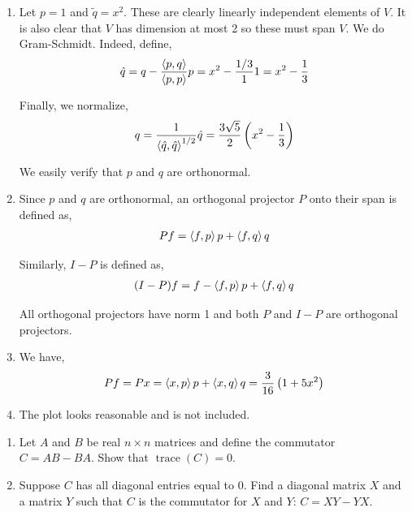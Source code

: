 \documentclass[10pt]{article}
\begin{document}
\begin{solution}[Solution]
\begin{enumerate}[label=(\alph*)]
    \item Let \( p = 1 \) and \( \tilde{q} = x^2 \). These are clearly linearly independent elements of \( V \). It is also clear that \( V \) has dimension at most 2 so these must span \( V \). We do Gram-Schmidt. Indeed, define,
        \begin{align*}
            \hat{q} = q - \frac{\left\langle p,q \right\rangle}{\left\langle p,p \right\rangle}p = x^2 - \frac{1/3}{1} 1 = x^2 - \frac{1}{3}
        \end{align*}
        
        Finally, we normalize,
        \begin{align*}
            q = \frac{1}{\left\langle \hat{q},\hat{q} \right\rangle^{1/2}} \hat{q} = \frac{3\sqrt{5}}{2} \left( x^2 - \frac{1}{3} \right)
        \end{align*}
        
        We easily verify that \( p \) and \( q \) are orthonormal.

    \item Since \( p \) and \( q \) are orthonormal, an orthogonal projector \( P \) onto their span is defined as,
        \begin{align*}
            Pf = \left\langle f,p \right\rangle p + \left\langle f,q \right\rangle q
        \end{align*}
        
        Similarly, \( I-P \) is defined as,
        \begin{align*}
            (I-P)f = f - \left\langle f,p \right\rangle p + \left\langle f,q \right\rangle q
        \end{align*}
        
        All orthogonal projectors have norm 1 and both \( P \) and \( I-P \) are orthogonal projectors.

    \item
        We have,
        \begin{align*}
            Pf = Px = \left\langle x,p \right\rangle p + \left\langle x,q \right\rangle q = \frac{3}{16} \left( 1+5x^2 \right)
        \end{align*}
        
    \item The plot looks reasonable and is not included.

\end{enumerate}
\end{solution}



\begin{problem}
    \begin{enumerate}[label=(\alph*),nolistsep]
        \item Let \( A \) and \( B \) be real \( n\times n \) matrices and define the commutator \( C = AB - BA \). Show that \( \operatorname{trace}(C) = 0 \).
        \item Suppose \( C \) has all diagonal entries equal to 0. Find a diagonal matrix \( X \) and a matrix \( Y \) such that \( C \) is the commutator for \( X \) and \( Y \): \( C = XY - YX \).
\end{enumerate}
\end{problem}
\end{document}
